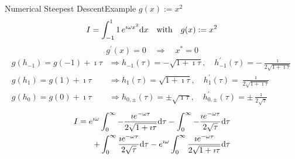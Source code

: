 \documentclass{beamer}
\begin{document}
\begin{frame}{Numerical Steepest Descent}{Example $g(x) := x^2$}
  \vspace{-0.5cm}
  \begin{equation*}
    I = \int_{-1}^{1} 1\, e^{\imath \omega x^2} \mathrm{d}x
    \quad \text{with} \quad
    g(x) := x^2
  \end{equation*}
  \begin{equation*}
    g^{\prime}(x) = 0 \quad \Rightarrow \quad x^{*} = 0
  \end{equation*}
  \begin{equation*}
    \begin{split}
    g(h_{-1}) = g(-1) + \imath \tau   & \Rightarrow
    h_{-1}(\tau) = -\sqrt{1+\imath\tau}, \quad
    h_{-1}^{\prime}(\tau) = -\frac{\imath}{2\sqrt{1+\imath\tau}} \\
    g(h_{1}) = g(1) + \imath \tau   & \Rightarrow
    h_{1}(\tau) = \sqrt{1+\imath\tau}, \quad
    h_{1}^{\prime}(\tau) = \frac{\imath}{2\sqrt{1+\imath\tau}} \\
    g(h_{0}) = g(0) + \imath \tau   & \Rightarrow
    h_{0,\pm}(\tau) = \pm\sqrt{\imath\tau}, \quad
    h_{0,\pm}^{\prime}(\tau) = \pm\frac{\imath}{2\sqrt{\tau}}
    \end{split}
  \end{equation*}
  \begin{equation*}
    \begin{split}
      I = e^{\imath\omega} \int_0^\infty -\frac{\imath e^{-\omega\tau}}{2\sqrt{1+\imath\tau}} \mathrm{d}\tau
      - \int_0^\infty -\frac{\imath e^{-\omega\tau}}{2\sqrt{\tau}} \mathrm{d}\tau \\
      + \int_0^\infty  \frac{\imath e^{-\omega\tau}}{2\sqrt{\tau}} \mathrm{d}\tau
    - e^{\imath\omega} \int_0^\infty \frac{\imath e^{-\omega\tau}}{2\sqrt{1+\imath\tau}} \mathrm{d}\tau
    \end{split}
  \end{equation*}
\end{frame}
\end{document}
